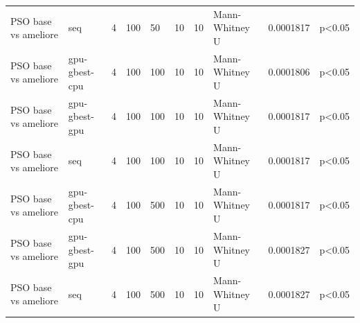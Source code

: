 \begin{table}[t]
\begin{tabular}{llllllllll}
PSO base vs ameliore & seq & 4 & 100 & 50 & 10 & 10 & Mann-Whitney U & 0.0001817 & p<0.05 \\
PSO base vs ameliore & gpu-gbest-cpu & 4 & 100 & 100 & 10 & 10 & Mann-Whitney U & 0.0001806 & p<0.05 \\
PSO base vs ameliore & gpu-gbest-gpu & 4 & 100 & 100 & 10 & 10 & Mann-Whitney U & 0.0001817 & p<0.05 \\
PSO base vs ameliore & seq & 4 & 100 & 100 & 10 & 10 & Mann-Whitney U & 0.0001817 & p<0.05 \\
PSO base vs ameliore & gpu-gbest-cpu & 4 & 100 & 500 & 10 & 10 & Mann-Whitney U & 0.0001817 & p<0.05 \\
PSO base vs ameliore & gpu-gbest-gpu & 4 & 100 & 500 & 10 & 10 & Mann-Whitney U & 0.0001827 & p<0.05 \\
PSO base vs ameliore & seq & 4 & 100 & 500 & 10 & 10 & Mann-Whitney U & 0.0001827 & p<0.05 \\
\bottomrule
\end{tabular}
\end{table}
